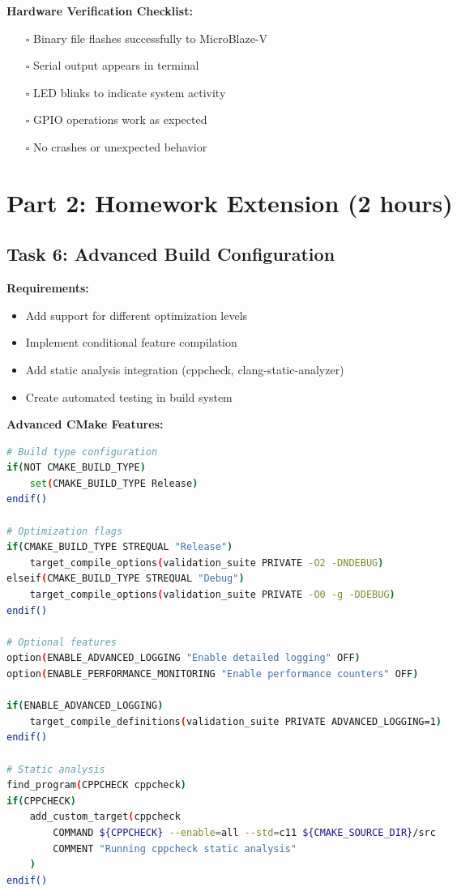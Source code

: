 \documentclass[11pt,a4paper]{article}
\begin{document}
\textbf{Hardware Verification Checklist:}
\begin{itemize}
    \item[$\square$] Binary file flashes successfully to MicroBlaze-V
    \item[$\square$] Serial output appears in terminal
    \item[$\square$] LED blinks to indicate system activity
    \item[$\square$] GPIO operations work as expected
    \item[$\square$] No crashes or unexpected behavior
\end{itemize}

\section{Part 2: Homework Extension (2 hours)}

\subsection{Task 6: Advanced Build Configuration}

\textbf{Requirements:}
\begin{itemize}
    \item Add support for different optimization levels
    \item Implement conditional feature compilation
    \item Add static analysis integration (cppcheck, clang-static-analyzer)
    \item Create automated testing in build system
\end{itemize}

\textbf{Advanced CMake Features:}
\begin{lstlisting}[language=bash]
# Build type configuration
if(NOT CMAKE_BUILD_TYPE)
    set(CMAKE_BUILD_TYPE Release)
endif()

# Optimization flags
if(CMAKE_BUILD_TYPE STREQUAL "Release")
    target_compile_options(validation_suite PRIVATE -O2 -DNDEBUG)
elseif(CMAKE_BUILD_TYPE STREQUAL "Debug")
    target_compile_options(validation_suite PRIVATE -O0 -g -DDEBUG)
endif()

# Optional features
option(ENABLE_ADVANCED_LOGGING "Enable detailed logging" OFF)
option(ENABLE_PERFORMANCE_MONITORING "Enable performance counters" OFF)

if(ENABLE_ADVANCED_LOGGING)
    target_compile_definitions(validation_suite PRIVATE ADVANCED_LOGGING=1)
endif()

# Static analysis
find_program(CPPCHECK cppcheck)
if(CPPCHECK)
    add_custom_target(cppcheck
        COMMAND ${CPPCHECK} --enable=all --std=c11 ${CMAKE_SOURCE_DIR}/src
        COMMENT "Running cppcheck static analysis"
    )
endif()
\end{lstlisting}
\end{document}
